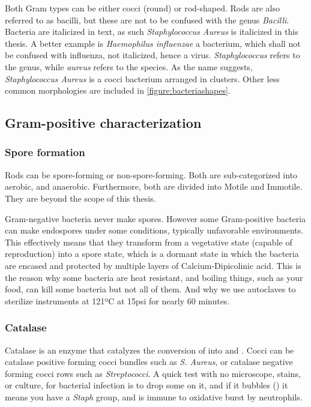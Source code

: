 Both Gram types can be either cocci (round) or rod-shaped. Rods are also referred to as bacilli, but these are not to be confused with the genus \textit{Bacilli}. Bacteria are italicized in text, as such \textit{Staphylococcus Aureus} is italicized in this thesis. A better example is \textit{Haemophilus influenzae} a bacterium, which shall not be confused with influenza, not italicized, hence a virus. \textit{Staphylococcus} refers to the genus, while \textit{aureus} refers to the species. As the name suggests, \textit{Staphylococcus Aureus} is a cocci bacterium arranged in clusters. Other less common morphologies are included in \ref{figure:bacteriashapes}. 

\subsection{Gram-positive characterization}

\subsubsection{Spore formation}

Rods can be spore-forming or non-spore-forming. Both are sub-categorized into aerobic, and anaerobic. Furthermore, both are divided into Motile and Immotile. They are beyond the scope of this thesis.

Gram-negative bacteria never make spores. However some Gram-positive bacteria can make endospores under some conditions, typically unfavorable environments. This effectively means that they transform from a vegetative state (capable of reproduction) into a spore state, which is a dormant state in which the bacteria are encased and protected by multiple layers of Calcium-Dipicolinic acid. This is the reason why some bacteria are heat resistant, and boiling things, such as your food, can kill some bacteria but not all of them. And why we use autoclaves to sterilize instruments at 121ºC at 15psi for nearly 60 minutes.

\subsubsection{Catalase}

Catalase is an enzyme that catalyzes the conversion of  into  and . Cocci can be catalase positive forming cocci bundles such as \textit{S. Aureus}, or catalase negative forming cocci rows such as \textit{Streptococci}. A quick test with no microscope, stains, or culture, for bacterial infection is to drop some  on it, and if it bubbles () it means you have a \textit{Staph} group, and is immune to oxidative burst by neutrophils.

